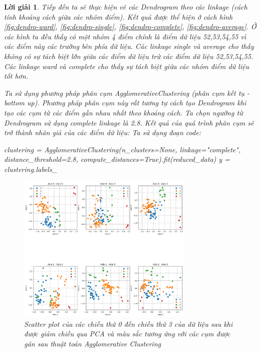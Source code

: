 \documentclass[14pt, a4paper]{article}
\theoremstyle{sltheorem}
\theoremstyle{soltheorem}
\newtheorem*{loigiai}{Lời giải}
\begin{document}
\begin{loigiai}
    Tiếp đến ta sẽ thực hiện vẽ các Dendrogram theo các linkage (cách tính khoảng cách giữa các nhóm điểm).
    Kết quả được thể hiện ở cách hình \ref{fig:dendro-ward}, \ref{fig:dendro-single}, \ref{fig:dendro-complete}, \ref{fig:dendro-average}.
    Ở các hình ta đều thấy có một nhóm 4 điểm chính là điểm dữ liệu 52,53,54,55 vì các điểm này các trường bên phía dữ liệu.
    Các linkage single và average cho thấy không có sự tách biệt lớn giữa các điểm dữ liệu trừ các điểm dữ liệu 52,53,54,55.
    Các linkage ward và complete cho thấy sự tách biệt giữa các nhóm điểm dữ liệu tốt hơn.
    
    Ta sử dụng phương pháp phân cụm AgglomerativeClustering (phân cụm kết tụ - bottom up).
    Phương pháp phân cụm này rất tương tự cách tạo Dendrogram khi tạo các cụm từ các điểm gần nhau nhất theo khoảng cách.
    Ta chọn ngưỡng từ Dendrogram sử dụng complete linkage là 2.8.
    Kết quả của quá trình phân cụm sẽ trở thành nhãn giả của các điểm dữ liệu:
    Ta sử dụng đoạn code:

    \begin{python}
clustering = AgglomerativeClustering(n_clusters=None, linkage="complete", distance_threshold=2.8, compute_distances=True).fit(reduced_data)
y = clustering.labels_
    \end{python}

    \begin{figure}[h!]
        \centering
        \includegraphics[width=0.75\textwidth]{figures/pca_scattering_4_dim_clustering.png}
        \caption{Scatter plot của các chiều thứ 0 đến chiều thứ 3 của dữ liệu sau khi được giảm chiều qua PCA và màu sắc tương ứng với các cụm được gán sau thuật toán Agglomerative Clustering}
        \label{fig:pca-scattering-4-dim-clustering}
    \end{figure}


\end{loigiai}
\end{document}
